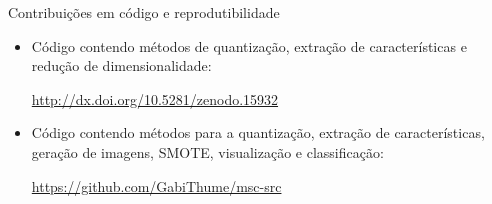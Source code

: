 \documentclass[10pt]{beamer}
\begin{document}
\begin{frame}{Contribuições em código e reprodutibilidade}
  \setlength\leftmargini{1em}
    \begin{itemize}
    \item Código contendo métodos de quantização, extração de características e redução de dimensionalidade:
    \begin{center}
      \small{\url{http://dx.doi.org/10.5281/zenodo.15932}}
    \end{center}
    \item Código contendo métodos para a quantização, extração de características, geração de imagens, SMOTE, visualização e classificação:
    \begin{center}
      \small{\url{https://github.com/GabiThume/msc-src}}
    \end{center}
  \end{itemize}
\end{frame}
\end{document}
